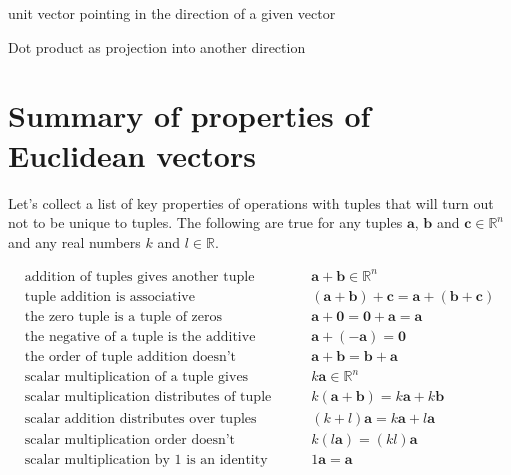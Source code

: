 unit vector pointing in the direction of a given vector

Dot product as projection into another direction

\section{Summary of properties of Euclidean vectors}\label{sec:ch1_summary}

Let's collect a list of key properties of operations with tuples that will turn out not to be unique to tuples. The following are true for any tuples $\mathbf{a}$, $\mathbf{b}$ and $\mathbf{c} \in\mathbb{R}^n$ and any real numbers $k$ and $l\in\mathbb{R}$.

\begin{align*}
& \text{addition of tuples gives another tuple} && \quad \mathbf{a} + \mathbf{b} \in \mathbb{R}^n &\\
%
& \text{tuple addition is associative} && \quad (\mathbf{a} + \mathbf{b}) + \mathbf{c}  =\mathbf{a} + (\mathbf{b} + \mathbf{c}) &\\
%
& \text{the zero tuple is a tuple of zeros} && \quad \mathbf{a} + \mathbf{0} = \mathbf{0} + \mathbf{a} = \mathbf{a} &\\
%
& \text{the negative of a tuple is the additive inverse} && \quad \mathbf{a} + (-\mathbf{a}) = \mathbf{0} &\\
%
& \text{the order of tuple addition doesn't matter} && \quad \mathbf{a} + \mathbf{b} = \mathbf{b} + \mathbf{a} &\\
%
& \text{scalar multiplication of a tuple gives another tuple} && \quad k\mathbf{a} \in \mathbb{R}^n &\\
%
& \text{scalar multiplication distributes of tuple addition} && \quad k(\mathbf{a}+\mathbf{b})=k\mathbf{a}+k\mathbf{b} &\\
%
& \text{scalar addition distributes over tuples} && \quad (k+l)\mathbf{a}=k\mathbf{a}+l\mathbf{a} &\\
%
& \text{scalar multiplication order doesn't matter} && \quad k(l\mathbf{a})=(kl)\mathbf{a} &\\
%
& \text{scalar multiplication by 1 is an identity operation} && \quad 1\mathbf{a}=\mathbf{a} &
\end{align*}